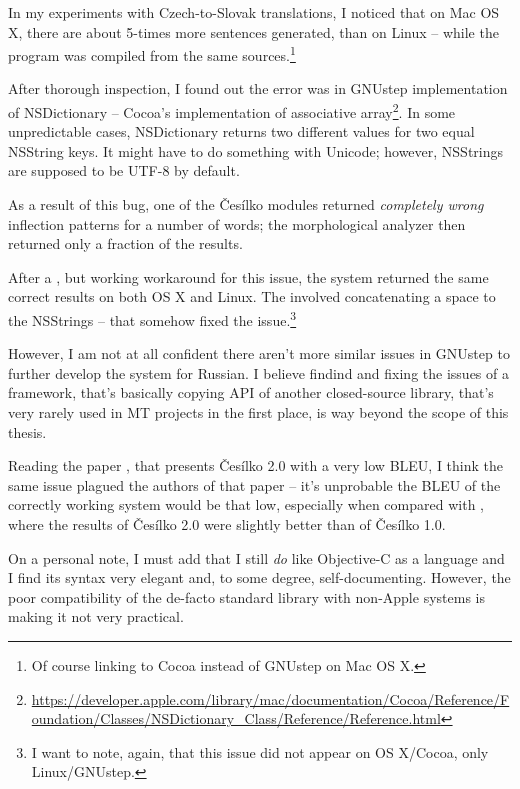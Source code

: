 In my experiments with Czech-to-Slovak translations, I noticed that on Mac OS X, there are about 5-times more sentences generated, than on Linux -- while the program was compiled from the same sources.\footnote{Of course linking to Cocoa instead of GNUstep on Mac OS X.}

After thorough inspection, I found out the error was in GNUstep implementation of NSDictionary -- Cocoa's implementation of associative array\footnote{\url{https://developer.apple.com/library/mac/documentation/Cocoa/Reference/Foundation/Classes/NSDictionary\_Class/Reference/Reference.html}}. In some unpredictable cases, NSDictionary returns two different values for two equal NSString keys. It might have to do something with Unicode; however, NSStrings are supposed to be UTF-8 by default.

As a result of this bug, one of the Česílko modules returned \emph{completely wrong} inflection patterns for a number of words; the morphological analyzer then returned only a fraction of the results.

After a , but working workaround for this issue, the system returned the same correct results on both OS X and Linux. The  involved concatenating a space to the NSStrings -- that somehow fixed the issue.\footnote{I want to note, again, that this issue did not appear on OS X/Cocoa, only Linux/GNUstep.} 

However, I am not at all confident there aren't more similar issues in GNUstep to further develop the system for Russian.
I believe findind and fixing the issues of a framework, that's basically copying API of another closed-source library, that's very rarely used in MT projects in the first place, is way beyond the scope of this thesis.


Reading the paper \cite{evalquality_cesilko}, that presents Česílko 2.0 with a very low BLEU, I think the same issue plagued the authors of that paper -- it's unprobable the BLEU of the correctly working system would be that low, especially when compared with \cite{cesilko2}, where the results of Česílko 2.0 were slightly better than of Česílko 1.0.

On a personal note, I must add that I still \emph{do} like Objective-C as a language and I find its syntax very elegant and, to some degree, self-documenting. However, the poor compatibility of the de-facto standard library with non-Apple systems is making it not very practical.

